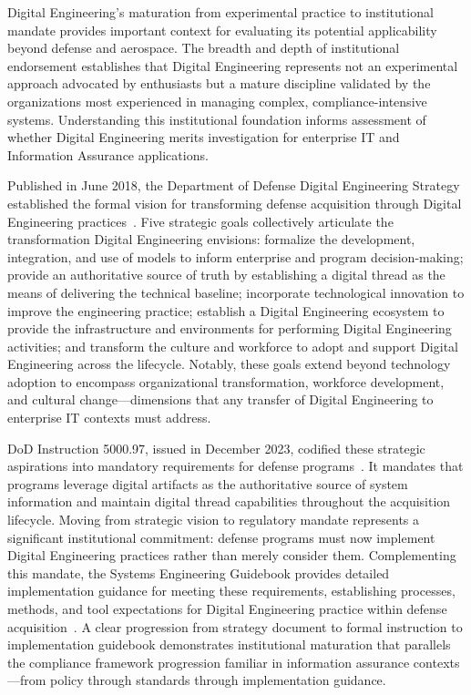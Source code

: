 Digital Engineering's maturation from experimental practice to institutional mandate provides important context for evaluating its potential applicability beyond defense and aerospace. The breadth and depth of institutional endorsement establishes that Digital Engineering represents not an experimental approach advocated by enthusiasts but a mature discipline validated by the organizations most experienced in managing complex, compliance-intensive systems. Understanding this institutional foundation informs assessment of whether Digital Engineering merits investigation for enterprise IT and Information Assurance applications.

Published in June 2018, the Department of Defense Digital Engineering Strategy established the formal vision for transforming defense acquisition through Digital Engineering practices~\parencite{DoD_DE_Strategy_2018}. Five strategic goals collectively articulate the transformation Digital Engineering envisions: formalize the development, integration, and use of models to inform enterprise and program decision-making; provide an authoritative source of truth by establishing a digital thread as the means of delivering the technical baseline; incorporate technological innovation to improve the engineering practice; establish a Digital Engineering ecosystem to provide the infrastructure and environments for performing Digital Engineering activities; and transform the culture and workforce to adopt and support Digital Engineering across the lifecycle. Notably, these goals extend beyond technology adoption to encompass organizational transformation, workforce development, and cultural change---dimensions that any transfer of Digital Engineering to enterprise IT contexts must address.

DoD Instruction 5000.97, issued in December 2023, codified these strategic aspirations into mandatory requirements for defense programs~\parencite{DoDI_5000_97_2023}. It mandates that programs leverage digital artifacts as the authoritative source of system information and maintain digital thread capabilities throughout the acquisition lifecycle. Moving from strategic vision to regulatory mandate represents a significant institutional commitment: defense programs must now implement Digital Engineering practices rather than merely consider them. Complementing this mandate, the Systems Engineering Guidebook provides detailed implementation guidance for meeting these requirements, establishing processes, methods, and tool expectations for Digital Engineering practice within defense acquisition~\parencite{DoD_Engineering_2022}. A clear progression from strategy document to formal instruction to implementation guidebook demonstrates institutional maturation that parallels the compliance framework progression familiar in information assurance contexts---from policy through standards through implementation guidance.

